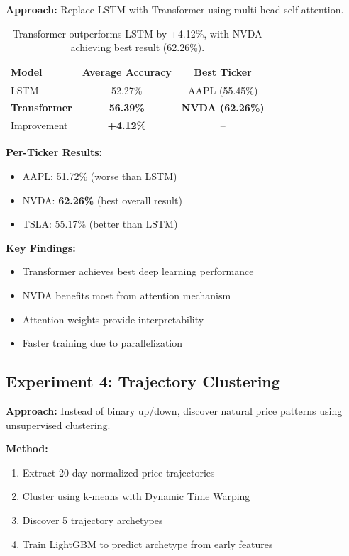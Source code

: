 \documentclass[10pt,twocolumn]{article}
\begin{document}
\textbf{Approach:} Replace LSTM with Transformer using multi-head self-attention.

\begin{table}[h]
\centering
\small
\begin{tabular}{lcc}
\toprule
Model & Average Accuracy & Best Ticker \\
\midrule
LSTM & 52.27\% & AAPL (55.45\%) \\
\textbf{Transformer} & \textbf{56.39\%} & \textbf{NVDA (62.26\%)} \\
\midrule
Improvement & \textbf{+4.12\%} & -- \\
\bottomrule
\end{tabular}
\caption{Transformer outperforms LSTM by +4.12\%, with NVDA achieving best result (62.26\%).}
\end{table}

\textbf{Per-Ticker Results:}
\begin{itemize}
\item AAPL: 51.72\% (worse than LSTM)
\item NVDA: \textbf{62.26\%} (best overall result)
\item TSLA: 55.17\% (better than LSTM)
\end{itemize}

\textbf{Key Findings:}
\begin{itemize}
\item Transformer achieves best deep learning performance
\item NVDA benefits most from attention mechanism
\item Attention weights provide interpretability
\item Faster training due to parallelization
\end{itemize}

\subsection{Experiment 4: Trajectory Clustering}

\textbf{Approach:} Instead of binary up/down, discover natural price patterns using unsupervised clustering.

\textbf{Method:}
\begin{enumerate}
\item Extract 20-day normalized price trajectories
\item Cluster using k-means with Dynamic Time Warping
\item Discover 5 trajectory archetypes
\item Train LightGBM to predict archetype from early features
\end{enumerate}
\end{document}
